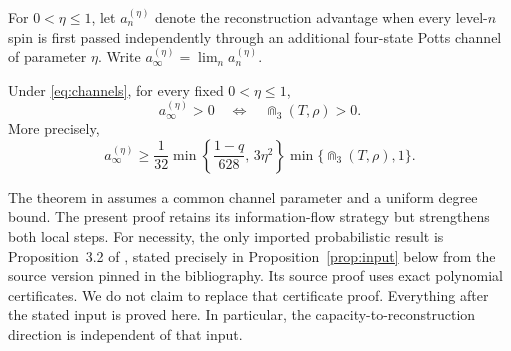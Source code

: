 For $0<\eta\le1$, let $a_n^{(\eta)}$ denote the reconstruction advantage
when every level-$n$ spin is first passed independently through an additional
four-state Potts channel of parameter $\eta$.  Write
$a_\infty^{(\eta)}=\lim_n a_n^{(\eta)}$.

\begin{corollary}\label{cor:robust}
Under \eqref{eq:channels}, for every fixed $0<\eta\le1$,
\[
 a_\infty^{(\eta)}>0
 \quad\Longleftrightarrow\quad
 \Cap_3(T,\rho)>0.
\]
More precisely,
\begin{equation}\label{eq:robust-lower}
 a_\infty^{(\eta)}
 \ge \frac1{32}
 \min\!\left\{\frac{1-q}{628},\,3\eta^2\right\}
 \min\{\Cap_3(T,\rho),1\}.
\end{equation}
\end{corollary}

The theorem in \cite{OAICapacity} assumes a common channel parameter and a
uniform degree bound. The present proof retains its information-flow
strategy but strengthens both local steps. For necessity, the only imported
probabilistic result is Proposition~3.2 of \cite{OAIThreshold}, stated
precisely in Proposition~\ref{prop:input} below from the source version pinned
in the bibliography. Its source proof uses exact polynomial certificates. We
do not claim to replace that certificate proof. Everything after the stated
input is proved here. In particular, the capacity-to-reconstruction direction
is independent of that input.
